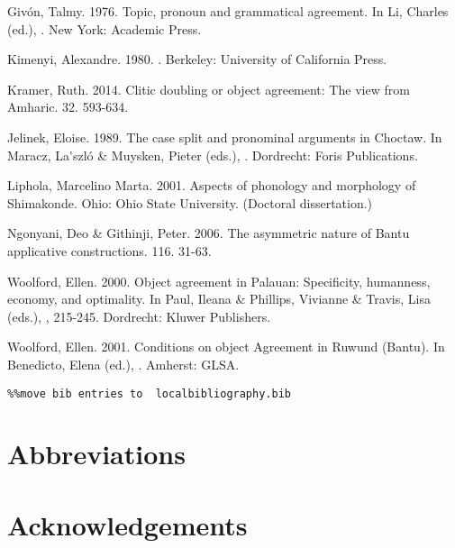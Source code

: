 \documentclass[output=paper]{langsci/langscibook}
\begin{document}
Givón, Talmy. 1976. Topic, pronoun and grammatical agreement. In Li, Charles (ed.), . New York: Academic Press.

Kimenyi, Alexandre. 1980. . Berkeley: University of California Press.

Kramer, Ruth. 2014. Clitic doubling or object agreement: The view from Amharic.  32. 593-634.

Jelinek, Eloise. 1989. The case split and pronominal arguments in Choctaw. In Maracz, La\'{ }szló \& Muysken, Pieter (eds.), . Dordrecht: Foris Publications.

Liphola, Marcelino Marta. 2001. Aspects of phonology and morphology of Shimakonde. Ohio: Ohio State University. (Doctoral dissertation.)

Ngonyani, Deo \& Githinji, Peter. 2006. The asymmetric nature of Bantu applicative constructions. 116. 31-63.

Woolford, Ellen. 2000. Object agreement in Palauan: Specificity, humanness, economy, and optimality. In Paul, Ileana \& Phillips, Vivianne \& Travis, Lisa (eds.), , 215-245. Dordrecht: Kluwer Publishers.

Woolford, Ellen. 2001. Conditions on object Agreement in Ruwund (Bantu). In Benedicto, Elena (ed.), . Amherst: GLSA.


\begin{verbatim}%%move bib entries to  localbibliography.bib
\end{verbatim}

\section*{Abbreviations}
\section*{Acknowledgements}

\printbibliography[heading=subbibliography,notkeyword=this]
\end{document}
